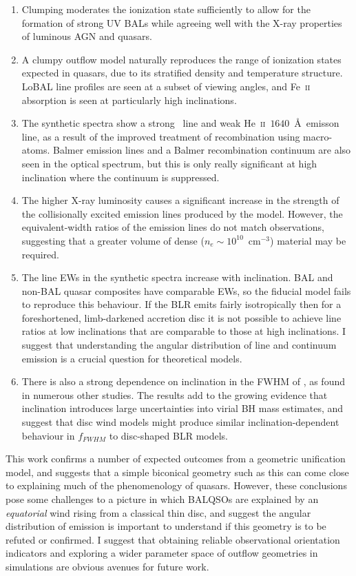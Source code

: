 \begin{enumerate}
\item Clumping moderates the ionization state
sufficiently to allow for the 
formation of strong UV BALs while agreeing well with the X-ray
properties of luminous AGN and quasars. 
\smallskip
\item A clumpy outflow model naturally 
reproduces the range of ionization states
expected in quasars, due to its stratified density
and temperature structure. 
LoBAL line profiles are seen at a subset of viewing angles, and Fe~\textsc{ii}
absorption is seen at particularly high inclinations. 
\smallskip
\item The synthetic spectra show a strong \la\ line and weak He~\textsc{ii}~$1640$~\AA\ emisson line,
as a result of the improved treatment of recombination using macro-atoms. 
Balmer emission lines and a Balmer recombination continuum are also
seen in the optical spectrum, but this
is only really significant at high inclination where 
the continuum is suppressed.  
\smallskip
\item The higher X-ray luminosity causes a significant 
increase in the strength of the collisionally excited emission
lines produced by the model. 
However, the equivalent-width ratios of the emission lines do not match
observations, suggesting that a greater volume of dense ($n_e\sim10^{10}$~cm$^{-3}$)
material may be required.
\smallskip
\item The line EWs in the synthetic spectra increase with inclination.
BAL and non-BAL quasar composites have comparable EWs, so the fiducial model
fails to reproduce this behaviour.
 If the BLR emits fairly isotropically then for a 
foreshortened, limb-darkened accretion disc 
it is not possible to achieve line ratios at low inclinations 
that are comparable to those at high inclinations. 
I suggest that understanding the angular distribution of 
line and continuum emission is a crucial question for theoretical models.
\smallskip
\item There is also a strong dependence on inclination in the FWHM of
\ha, as found in numerous other studies. The results add to the growing evidence
that inclination introduces large uncertainties into virial 
BH mass estimates, and suggest that disc wind models might produce similar inclination-dependent
behaviour in $f_{FWHM}$ to disc-shaped BLR models.
\end{enumerate}
This work confirms a number of expected outcomes from a geometric unification 
model, and suggests that a simple biconical geometry such as this can come close to 
explaining much of the  phenomenology of quasars. However, these conclusions pose 
some challenges to a picture in which BALQSOs are
explained by an {\em equatorial} wind rising from a classical thin disc, and suggest 
the angular distribution of emission is important to understand if this 
geometry is to be refuted or confirmed. I suggest that obtaining reliable 
observational orientation indicators and 
exploring a wider parameter space of outflow geometries in simulations
are obvious avenues for future work.
